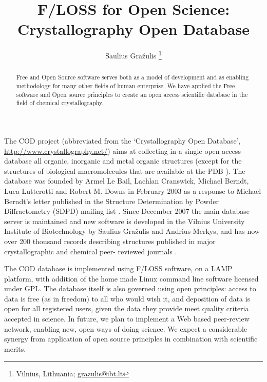 \documentclass[10pt, a5paper]{article}
\begin{document}
\title{F/LOSS for Open Science: Crystallography Open Database}
\author{Saulius Gražulis \footnote{Vilnius, Lithuania; \url{grazulis@ibt.lt}}}
\maketitle
\begin{abstract}
Free and Open Source software serves both as a model of development and as enabling methodology for many other fields of human enterprise. We have applied the Free software and Open source principles to create an open access scientific database in the field of chemical crystallography.
\end{abstract}
The COD project (abbreviated from the `Crystallography Open Database', \url{http://www.crystallography.net/}) aims at collecting in a single open access database all organic, inorganic and metal organic structures \cite{graz1} (except for the structures of biological macromolecules that are available at the PDB \cite{graz2}). The database was founded by Armel Le Bail, Lachlan Cranswick, Michael Berndt, Luca Lutterotti and Robert M. Downs in February 2003 as a response to Michael Berndt’s letter published in the Structure Determination by Powder Diffractometry (SDPD) mailing list \cite{graz3}. Since December 2007 the main database server is maintained and new software is developed in the Vilnius University Institute of Biotechnology by Saulius Gražulis and Andrius Merkys, and has now over 200 thousand records describing structures published in major crystallographic and chemical peer- \linebreak reviewed journals \cite{graz4}.

The COD database is implemented using F/LOSS software, on a LAMP platform, with addition of the home made Linux command line software licensed under GPL. The database itself is also governed using open principles: access to data is free (as in freedom) to all who would wish it, and deposition of data is open for all registered users, given the data they provide meet quality criteria accepted in science. In future, we plan to implement a Web based peer-review network, enabling new, open ways of doing science. We expect a considerable synergy from application of open source principles in combination with scientific merits.
\end{document}

